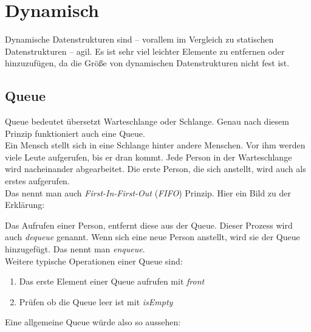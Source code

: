 \section{Dynamisch}
\begin{flushleft}   
    Dynamische Datenstrukturen sind -- vorallem im Vergleich zu statischen Datenstrukturen -- agil.
    Es ist sehr viel leichter Elemente zu entfernen oder hinzuzufügen, da die Größe von dynamischen Datenstrukturen nicht fest ist.
\end{flushleft}

\subsection{Queue}
\begin{flushleft}   
    Queue bedeutet übersetzt Warteschlange oder Schlange.
    Genau nach diesem Prinzip funktioniert auch eine Queue. \\
    Ein Mensch stellt sich in eine Schlange hinter andere Menschen.
    Vor ihm werden viele Leute aufgerufen, bis er dran kommt.
    Jede Person in der Warteschlange wird nacheinander abgearbeitet.
    Die erste Person, die sich anstellt, wird auch als erstes aufgerufen. \\
    Das nennt man auch \textit{First-In-First-Out} (\textit{FIFO}) Prinzip.
    Hier ein Bild zu der Erklärung:
\end{flushleft}

\begin{center}
\end{center}

\begin{flushleft}
    Das Aufrufen einer Person, entfernt diese aus der Queue.
    Dieser Prozess wird auch \textit{dequeue} genannt.
    Wenn sich eine neue Person anstellt, wird sie der Queue hinzugefügt.
    Das nennt man \textit{enqueue}. \\
    Weitere typische Operationen einer Queue sind:
    \begin{enumerate}
        \item {
                Das erste Element einer Queue aufrufen mit \textit{front}
            }
        \item {
                Prüfen ob die Queue leer ist mit \textit{isEmpty}
            }
    \end{enumerate}
    Eine allgemeine Queue würde also so aussehen:
\end{flushleft}

